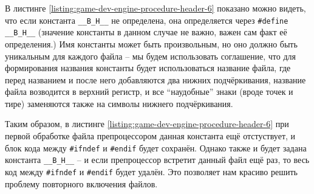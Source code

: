 \documentclass[../sparc.tex]{subfiles}
\begin{document}
В листинге \ref{listing:game-dev-engine-procedure-header-6} показано можно
видеть, что если константа \texttt{__B_H__} не определена, она
определяется через \texttt{#define __B_H__} (значение константы в
данном случае не важно, важен сам факт её определения.)  Имя константы может
быть произвольным, но оно должно быть уникальным для каждого файла -- мы будем
использовать соглашение, что для формирования названия константы будет
использоваться название файла, где перед названием и после него добавляются два
нижних подчёркивания, название файла возводится в верхний регистр, и все
``наудобные'' знаки (вроде точек и тире) заменяются также на символы нижнего
подчёркивания.

Таким образом, в листинге \ref{listing:game-dev-engine-procedure-header-6} при
первой обработке файла препроцессором данная константа ещё отстуствует, и блок
кода между \texttt{#ifndef} и \texttt{#endif} будет сохранён.
Однако также и будет задана константа \texttt{__B_H__} -- и если
препроцессор встретит данный файл ещё раз, то весь код между
\texttt{#ifndef} и \texttt{#endif} будет удалён.  Это
позволяет нам красиво решить проблему повторного включения файлов.
\end{document}
